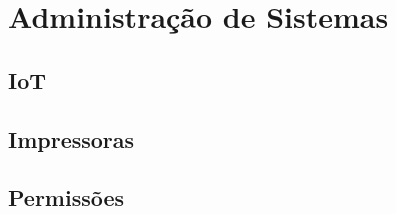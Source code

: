 \chapter{Administração de Sistemas}

\section{IoT}



\newpage
\section{Impressoras}

\newpage
\section{Permissões}

